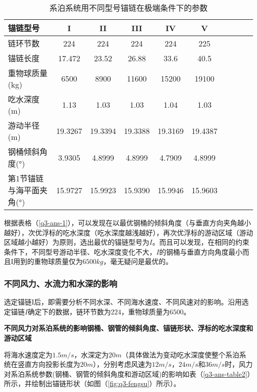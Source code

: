 \documentclass[withoutpreface,bwprint]{cumcmthesis} %
\begin{document}
\begin{table}[!htbp]
\centering
\caption{系泊系统用不同型号锚链在极端条件下的参数}
\label{q3-ans-table1}
\begin{tabular}{lccccccccc}
\toprule
锚链型号 & I & II & III & IV & V \\
\midrule
链环节数	&224&224&224&224&225\\ 
锚链长度	& 17.472&23.52&26.88&33.6&40.5\\
重物球质量(kg) &6500&8900&11600&15200&19100\\
吃水深度(m)	&1.13&1.03&1.03&1.04&1.03\\
游动半径(m)	&19.3267&19.3394&19.3388&19.3169&19.4387\\
钢桶倾斜角度(°)	& 3.9305&4.8999&4.8999&4.7909&4.8999\\
第1节锚链与海平面夹角(°)&15.9727&15.9923&15.9390&15.9946&15.9603\\
\bottomrule 
\end{tabular}
\end{table}

\par 根据表格（\ref{q3-ans-1}），可以发现在以最优钢桶的倾斜角度（与垂直方向夹角越小越好），次优浮标的吃水深度（吃水深度越浅越好），再次优浮标的游动区域（游动区域越小越好）为原则，选出最优的锚链型号为$I$。而且可以发现，在相同的约束条件下，不同型号游动半径、吃水深度变化不大，$I$的钢桶与垂直方向角度最小而且I用到的重物球质量仅为$6500kg$，毫无疑问是最优的。

\subsubsection{不同风力、水流力和水深的影响}

\par 选定锚链I后，即需要分析不同水深、不同海水速度、不同风速对的影响。沿用选定锚链$I$确定下的数据，链环节数为$224$，重物球质量为$6500$。

\textbf{不同风力对系泊系统的影响钢桶、钢管的倾斜角度、锚链形状、浮标的吃水深度和游动区域}
\par 将海水速度定为$1.5m/s$，水深定为$20m$（具体做法为变动吃水深度使整个系泊系统在竖直方向投影长度为$20m$），分别考虑风速为$12m/s$，$24m/s$和$36m/s$时，风力对系泊系统参数(钢桶、钢管的倾斜角度和游动区域)的影响如表（\ref{q3-ans-table2}）所示，并绘制出锚链形状（如图（\ref{fig:q3-fengsu}）所示）。
\end{document}
